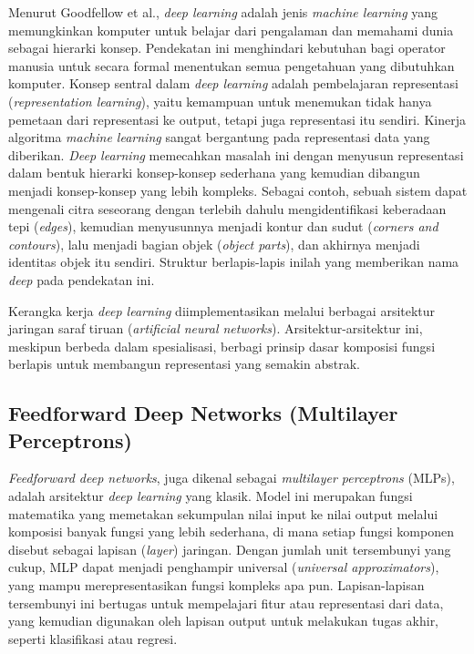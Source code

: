 Menurut Goodfellow et al., \textit{deep learning} adalah jenis \textit{machine learning} yang memungkinkan komputer untuk belajar dari pengalaman dan memahami dunia sebagai hierarki konsep. Pendekatan ini menghindari kebutuhan bagi operator manusia untuk secara formal menentukan semua pengetahuan yang dibutuhkan komputer. Konsep sentral dalam \textit{deep learning} adalah pembelajaran representasi (\textit{representation learning}), yaitu kemampuan untuk menemukan tidak hanya pemetaan dari representasi ke output, tetapi juga representasi itu sendiri. Kinerja algoritma \textit{machine learning} sangat bergantung pada representasi data yang diberikan. \textit{Deep learning} memecahkan masalah ini dengan menyusun representasi dalam bentuk hierarki konsep-konsep sederhana yang kemudian dibangun menjadi konsep-konsep yang lebih kompleks. Sebagai contoh, sebuah sistem dapat mengenali citra seseorang dengan terlebih dahulu mengidentifikasi keberadaan tepi (\textit{edges}), kemudian menyusunnya menjadi kontur dan sudut (\textit{corners and contours}), lalu menjadi bagian objek (\textit{object parts}), dan akhirnya menjadi identitas objek itu sendiri. Struktur berlapis-lapis inilah yang memberikan nama \textit{deep} pada pendekatan ini\parencite{Goodfellow2016}.

Kerangka kerja \textit{deep learning} diimplementasikan melalui berbagai arsitektur jaringan saraf tiruan (\textit{artificial neural networks}). Arsitektur-arsitektur ini, meskipun berbeda dalam spesialisasi, berbagi prinsip dasar komposisi fungsi berlapis untuk membangun representasi yang semakin abstrak.

\subsection{Feedforward Deep Networks (Multilayer Perceptrons)}
\textit{Feedforward deep networks}, juga dikenal sebagai \textit{multilayer perceptrons} (MLPs), adalah arsitektur \textit{deep learning} yang klasik. Model ini merupakan fungsi matematika yang memetakan sekumpulan nilai input ke nilai output melalui komposisi banyak fungsi yang lebih sederhana, di mana setiap fungsi komponen disebut sebagai lapisan (\textit{layer}) jaringan. Dengan jumlah unit tersembunyi yang cukup, MLP dapat menjadi penghampir universal (\textit{universal approximators}), yang mampu merepresentasikan fungsi kompleks apa pun. Lapisan-lapisan tersembunyi ini bertugas untuk mempelajari fitur atau representasi dari data, yang kemudian digunakan oleh lapisan output untuk melakukan tugas akhir, seperti klasifikasi atau regresi\parencite{Goodfellow2016}.


